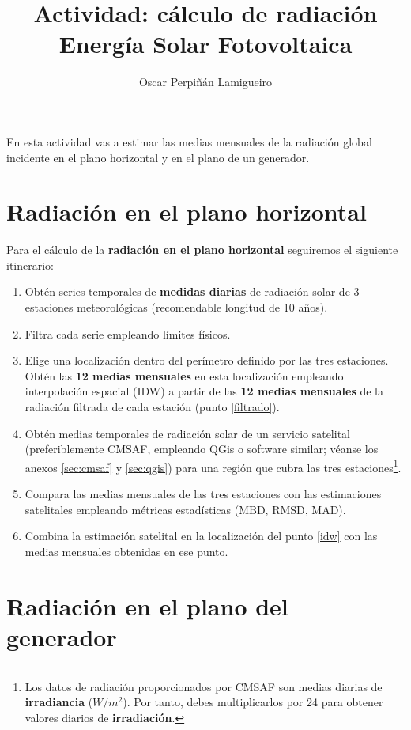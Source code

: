 \documentclass[11pt]{article}
\author{Oscar Perpiñán Lamigueiro}
\date{}
\title{Actividad: cálculo de radiación\\\medskip
\large Energía Solar Fotovoltaica}
\begin{document}
\maketitle

En esta actividad vas a estimar las medias mensuales de la radiación
global incidente en el plano horizontal y en el plano de un generador.

\section{Radiación en el plano horizontal}

Para el cálculo de la \textbf{radiación en el plano horizontal}
seguiremos el siguiente itinerario:

\begin{enumerate}
\item Obtén series temporales de \textbf{medidas diarias} de radiación
  solar de 3 estaciones meteorológicas (recomendable longitud de 10
  años).
\item Filtra cada serie empleando límites físicos. \label{filtrado}
\item Elige una localización dentro del perímetro definido por las
  tres estaciones. Obtén las \textbf{12 medias mensuales} en esta
  localización empleando interpolación espacial (IDW) a partir de las
  \textbf{12 medias mensuales} de la radiación filtrada de cada
  estación (punto \ref{filtrado}). \label{idw}
\item Obtén medias temporales de radiación solar de un servicio
  satelital (preferiblemente CMSAF, empleando QGis o software similar;
  véanse los anexos \ref{sec:cmsaf} y \ref{sec:qgis}) para una región que
  cubra las tres estaciones\footnote{Los datos de radiación
    proporcionados por CMSAF son medias diarias de
    \textbf{irradiancia} (\(W/m^2\)). Por tanto, debes multiplicarlos
    por 24 para obtener valores diarios de
    \textbf{irradiación}.}.\label{satelite}
\item Compara las medias mensuales de las tres estaciones con las
  estimaciones satelitales empleando métricas estadísticas (MBD, RMSD,
  MAD).
\item Combina la estimación satelital en la localización del punto
  \ref{idw} con las medias mensuales obtenidas en ese punto.
\end{enumerate}

\clearpage

\section{Radiación en el plano del generador}
\end{document}
